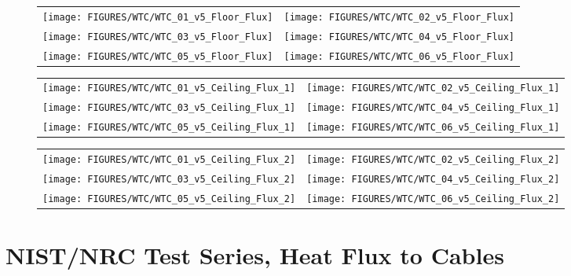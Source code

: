 \begin{figure}[p]
\begin{tabular*}{\textwidth}{l@{\extracolsep{\fill}}r}
\texttt{[image: FIGURES/WTC/WTC\_01\_v5\_Floor\_Flux]} &
\texttt{[image: FIGURES/WTC/WTC\_02\_v5\_Floor\_Flux]} \\
\texttt{[image: FIGURES/WTC/WTC\_03\_v5\_Floor\_Flux]} &
\texttt{[image: FIGURES/WTC/WTC\_04\_v5\_Floor\_Flux]} \\
\texttt{[image: FIGURES/WTC/WTC\_05\_v5\_Floor\_Flux]} &
\texttt{[image: FIGURES/WTC/WTC\_06\_v5\_Floor\_Flux]}
\end{tabular*}
\label{NIST_WTC_Floor_Flux}
\end{figure}

\begin{figure}[p]
\begin{tabular*}{\textwidth}{l@{\extracolsep{\fill}}r}
\texttt{[image: FIGURES/WTC/WTC\_01\_v5\_Ceiling\_Flux\_1]} &
\texttt{[image: FIGURES/WTC/WTC\_02\_v5\_Ceiling\_Flux\_1]} \\
\texttt{[image: FIGURES/WTC/WTC\_03\_v5\_Ceiling\_Flux\_1]} &
\texttt{[image: FIGURES/WTC/WTC\_04\_v5\_Ceiling\_Flux\_1]} \\
\texttt{[image: FIGURES/WTC/WTC\_05\_v5\_Ceiling\_Flux\_1]} &
\texttt{[image: FIGURES/WTC/WTC\_06\_v5\_Ceiling\_Flux\_1]}
\end{tabular*}
\label{NIST_WTC_Ceiling_Flux_1}
\end{figure}

\begin{figure}[p]
\begin{tabular*}{\textwidth}{l@{\extracolsep{\fill}}r}
\texttt{[image: FIGURES/WTC/WTC\_01\_v5\_Ceiling\_Flux\_2]} &
\texttt{[image: FIGURES/WTC/WTC\_02\_v5\_Ceiling\_Flux\_2]} \\
\texttt{[image: FIGURES/WTC/WTC\_03\_v5\_Ceiling\_Flux\_2]} &
\texttt{[image: FIGURES/WTC/WTC\_04\_v5\_Ceiling\_Flux\_2]} \\
\texttt{[image: FIGURES/WTC/WTC\_05\_v5\_Ceiling\_Flux\_2]} &
\texttt{[image: FIGURES/WTC/WTC\_06\_v5\_Ceiling\_Flux\_2]}
\end{tabular*}
\label{NIST_WTC_Ceiling_Flux_2}
\end{figure}


\clearpage

\section{NIST/NRC Test Series, Heat Flux to Cables}

